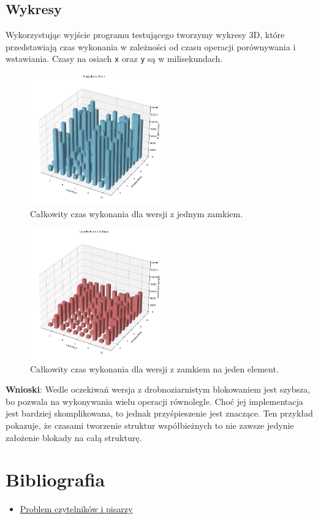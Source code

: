 \documentclass[11pt]{article}
\begin{document}
\subsection*{Wykresy}
\label{sec:org8be14fd}
Wykorzystując wyjście programu testującego tworzymy wykresy 3D, które przedstawiają czas wykonania
w zależności od czasu operacji porównywania i wstawiania.
Czasy na osiach \texttt{x} oraz \texttt{y} są w milisekundach.

\begin{figure}[H]
\centering
\includegraphics[width=0.5\textwidth]{./sing.png}
\caption{Całkowity czas wykonania dla wersji z jednym zamkiem.}
\end{figure}

\begin{figure}[H]
\centering
\includegraphics[width=0.5\textwidth]{./pe.png}
\caption{Całkowity czas wykonania dla wersji z zamkiem na jeden element.}
\end{figure}

\textbf{Wnioski}: Wedle oczekiwań wersja z drobnoziarnistym blokowaniem jest szybsza,
bo pozwala na wykonywania wielu operacji równolegle.
Choć jej implementacja jest bardziej skomplikowana, to jednak
przyśpieszenie jest znaczące.
Ten przykład pokazuje, że czasami tworzenie struktur
współbieżnych to nie zawsze jedynie założenie blokady na całą strukturę.
\section*{Bibliografia}
\label{sec:org7eef782}
\begin{itemize}
\item \href{https://en.wikipedia.org/wiki/Readers\%E2\%80\%93writers\_problem}{Problem  czytelników i pisarzy}
\end{itemize}
\end{document}
